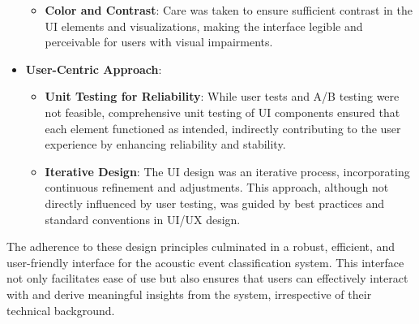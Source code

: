 \begin{itemize}
\begin{itemize}
          \item \textbf{Color and Contrast}: Care was taken to ensure sufficient contrast in the UI elements and visualizations, making the interface legible and perceivable for users with visual impairments.
        \end{itemize}
  \item \textbf{User-Centric Approach}: \begin{itemize}
          \item \textbf{Unit Testing for Reliability}: While user tests and A/B testing were not feasible, comprehensive unit testing of UI components ensured that each element functioned as intended, indirectly contributing to the user experience by enhancing reliability and stability.
          \item \textbf{Iterative Design}: The UI design was an iterative process, incorporating continuous refinement and adjustments. This approach, although not directly influenced by user testing, was guided by best practices and standard conventions in UI/UX design.
        \end{itemize}
\end{itemize}

The adherence to these design principles culminated in a robust, efficient, and user-friendly interface for the acoustic event classification system. This interface not only facilitates ease of use but also ensures that users can effectively interact with and derive meaningful insights from the system, irrespective of their technical background.
